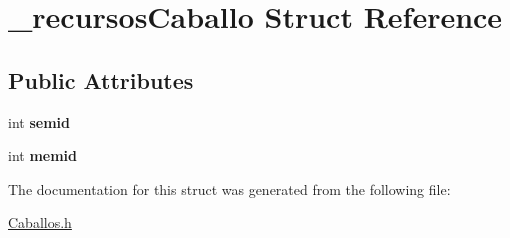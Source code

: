 \hypertarget{struct__recursosCaballo}{}\section{\+\_\+recursos\+Caballo Struct Reference}
\label{struct__recursosCaballo}
\subsection*{Public Attributes}
\begin{DoxyCompactItemize}
\item 
int {\bfseries semid}\hypertarget{struct__recursosCaballo_ab12475115060e224b5dfbf0d34bd338b}{}\label{struct__recursosCaballo_ab12475115060e224b5dfbf0d34bd338b}

\item 
int {\bfseries memid}\hypertarget{struct__recursosCaballo_a61dbdf2a7d4e7199cfad993d2730e4e3}{}\label{struct__recursosCaballo_a61dbdf2a7d4e7199cfad993d2730e4e3}

\end{DoxyCompactItemize}


The documentation for this struct was generated from the following file\+:\begin{DoxyCompactItemize}
\item 
\hyperlink{Caballos_8h}{Caballos.\+h}\end{DoxyCompactItemize}
